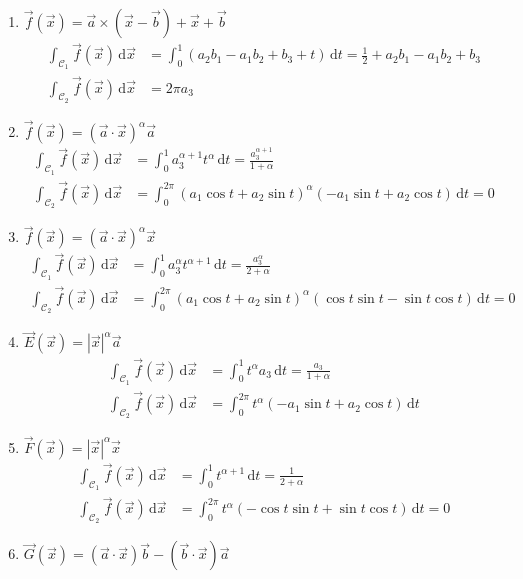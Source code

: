 \documentclass[11pt,answers]{exam}
\begin{document}
\begin{questions}
\begin{solution}
\begin{enumerate}
\item $\vec{f}(\vec{x})=\vec{a}\times(\vec{x}-\vec{b})+\vec{x}+\vec{b}$
\begin{align*}
\int_{\mathcal{C}_1}\vec{f}(\vec{x})\,\mathrm d\vec{x}
&=
\int_0^1(a_2b_1-a_1b_2+b_3+t)\,\mathrm dt=\frac{1}{2}+a_2b_1-a_1b_2+b_3
\\
\int_{\mathcal{C}_2}\vec{f}(\vec{x})\,\mathrm d\vec{x}
&=2\pi a_3
\end{align*}
\item $\vec{f}(\vec{x})=(\vec{a}\cdot\vec{x})^\alpha\vec{a}$
\begin{align*}
	\int_{\mathcal{C}_1}\vec{f}(\vec{x})\,\mathrm d\vec{x}
	&=
	\int_0^1a_3^{\alpha+1} t^{\alpha}\,\mathrm dt=\frac{a_3^{\alpha+1}}{1+\alpha}
	\\
	\int_{\mathcal{C}_2}\vec{f}(\vec{x})\,\mathrm d\vec{x}
	&=
	\int_0^{2\pi}(a_1\cos t +a_2\sin t )^\alpha(-a_1\sin t + a_2\cos t)\,\mathrm dt=0
\end{align*}
\item $\vec{f}(\vec{x})=(\vec{a}\cdot\vec{x})^\alpha\vec{x}$
\begin{align*}
\int_{\mathcal{C}_1}\vec{f}(\vec{x})\,\mathrm d\vec{x}
&=
\int_0^1a_3^\alpha t^{\alpha+1}\,\mathrm dt=\frac{a_3^\alpha}{2+\alpha}
\\
\int_{\mathcal{C}_2}\vec{f}(\vec{x})\,\mathrm d\vec{x}
&=
\int_0^{2\pi}(a_1\cos t +a_2\sin t )^\alpha(\cos t\sin t-\sin t\cos t)\,\mathrm dt=0
\end{align*}
\item $\vec{E}(\vec{x})=|\vec{x}|^\alpha\vec{a}$
\begin{align*}
\int_{\mathcal{C}_1}\vec{f}(\vec{x})\,\mathrm d\vec{x}
&=
\int_0^1t^\alpha a_3\,\mathrm dt=\frac{a_3}{1+\alpha}
\\
\int_{\mathcal{C}_2}\vec{f}(\vec{x})\,\mathrm d\vec{x}
&=
\int_0^{2\pi}t^\alpha(-a_1\sin t+a_2\cos t)\,\mathrm dt
\end{align*}
\item $\vec{F}(\vec{x})=|\vec{x}|^\alpha\vec{x}$
\begin{align*}
	\int_{\mathcal{C}_1}\vec{f}(\vec{x})\,\mathrm d\vec{x}
	&=
	\int_0^1t^{\alpha+1}\,\mathrm dt=\frac{1}{2+\alpha}
	\\
	\int_{\mathcal{C}_2}\vec{f}(\vec{x})\,\mathrm d\vec{x}
	&=
	\int_0^{2\pi}t^\alpha(-\cos t\sin t+\sin t\cos t)\,\mathrm dt=0
\end{align*}
\item $\vec{G}(\vec{x})=(\vec{a}\cdot\vec{x})\vec{b}-(\vec{b}\cdot\vec{x})\vec{a}$

\end{enumerate}
\end{solution}
\end{questions}
\end{document}
